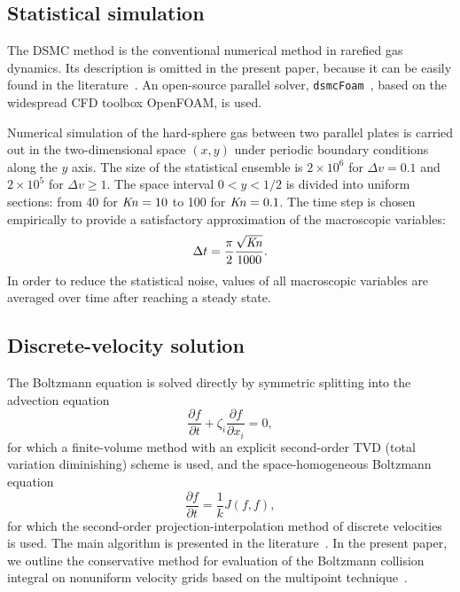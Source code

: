 \documentclass[review]{elsarticle}
\newcommand{\Kn}{\mbox{\textit{Kn}}}
\newcommand{\pder}[2][]{\frac{\partial#1}{\partial#2}}
\begin{document}
\subsection{Statistical simulation}

The DSMC method is the conventional numerical method in rarefied gas dynamics.
Its description is omitted in the present paper,
because it can be easily found in the literature~\citep[see e.g.][]{Bird1994, Sone2007}.
An open-source parallel solver, \verb+dsmcFoam+~\citep{Reese2010},
based on the widespread CFD toolbox OpenFOAM\textregistered{}, is used.

Numerical simulation of the hard-sphere gas between two parallel plates is carried out
in the two-dimensional space \((x,y)\) under periodic boundary conditions along the \(y\) axis.
The size of the statistical ensemble is \(2\times10^6\) for \(\Delta{v}=0.1\)
and \(2\times10^5\) for \(\Delta{v}\ge1\).
The space interval \(0<y<1/2\) is divided into uniform sections:
from 40 for \(\Kn=10\) to 100 for \(\Kn=0.1\).
The time step is chosen empirically to provide a satisfactory approximation of the macroscopic variables:
\begin{equation}\label{eq:dsmc_timestep}
    \Delta{t} = \frac{\pi}2 \frac{\sqrt{\Kn}}{1000}.
\end{equation}
In order to reduce the statistical noise, values of all macroscopic variables
are averaged over time after reaching a steady state.

\subsection{Discrete-velocity solution}

The Boltzmann equation is solved directly by symmetric splitting
into the advection equation
\begin{equation}\label{eq:split_advection}
    \pder[f]{t} + \zeta_i\pder[f]{x_i} = 0,
\end{equation}
for which a finite-volume method with an explicit second-order TVD (total variation diminishing) scheme is used,
and the space-homogeneous Boltzmann equation
\begin{equation}\label{eq:split_collisions}
    \pder[f]{t} = \frac1k J(f,f),
\end{equation}
for which the second-order projection-interpolation method of discrete velocities is used.
The main algorithm is presented in the literature~\citep[see e.g.][]{Tcheremissine1998, Tcheremissine2006, Dodulad2015}.
In the present paper, we outline the conservative method for evaluation of the Boltzmann collision integral
on nonuniform velocity grids based on the multipoint technique~\citep{Dodulad2012}.
\end{document}

